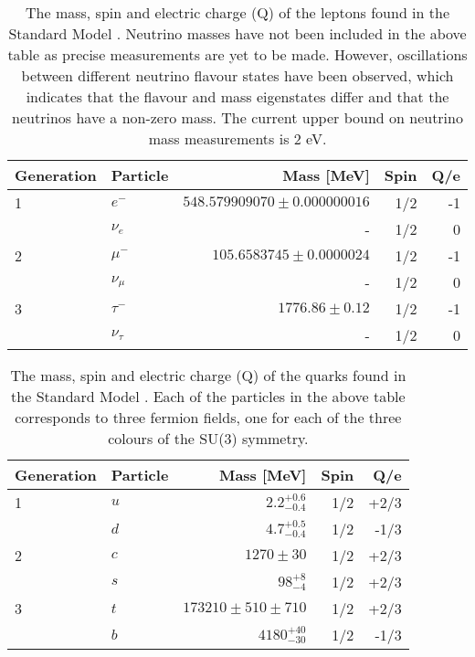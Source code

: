 \begin{table}[h!]
\centering
\begin{tabular}{l l r r r}
\hline
Generation & Particle & Mass [MeV] & Spin & Q/e \\
\hline
1 & $e^{-}$ & $548.579909070\pm0.000000016$ & 1/2 & -1 \\
& $\nu_{e}$ & - & 1/2 & 0 \\
\hline
2 & $\mu^{-}$ & $105.6583745\pm0.0000024$ & 1/2 & -1 \\
& $\nu_{\mu}$ & - & 1/2 & 0 \\
\hline
3 & $\tau^{-}$ & $1776.86\pm0.12$ & 1/2 & -1 \\
& $\nu_{\tau}$ & - & 1/2 & 0 \\
\end{tabular}
\caption[The mass, spin and electric charge (Q) of the leptons found in the Standard Model \cite{Beringer:1900zz}.  Neutrino masses have not been included in the above table as precise measurements are yet to be made.  However, oscillations between different neutrino flavour states have been observed, which indicates that the flavour and mass eigenstates differ and that the neutrinos have a non-zero mass.  The current upper bound on neutrino mass measurements is 2 eV.]{The mass, spin and electric charge (Q) of the leptons found in the Standard Model \cite{Beringer:1900zz}.  Neutrino masses have not been included in the above table as precise measurements are yet to be made.  However, oscillations between different neutrino flavour states have been observed, which indicates that the flavour and mass eigenstates differ and that the neutrinos have a non-zero mass.  The current upper bound on neutrino mass measurements is 2 eV.}
\label{table:smleptons}
\end{table}

\begin{table}[h!]
\centering
\begin{tabular}{l l r r r}
\hline
Generation & Particle & Mass [MeV] & Spin & Q/e \\
\hline
1 & $u$ & $2.2^{+0.6}_{-0.4}$ & 1/2 & +2/3 \\
 & $d$ & $4.7^{+0.5}_{-0.4}$ & 1/2 & -1/3 \\
\hline
2 & $c$ & $1270\pm30$ & 1/2 & +2/3 \\
 & $s$ & $98^{+8}_{-4}$ & 1/2 & +2/3 \\
\hline
3 & $t$ & $173210 \pm 510 \pm 710$ & 1/2 & +2/3 \\
 & $b$ & $4180^{+40}_{-30}$ & 1/2 & -1/3 \\
\end{tabular}
\caption[The mass, spin and electric charge (Q) of the quarks found in the Standard Model \cite{Beringer:1900zz}.  Each of the particles in the above table corresponds to three fermion fields, one for each of the three colours of the SU(3) symmetry.]{The mass, spin and electric charge (Q) of the quarks found in the Standard Model \cite{Beringer:1900zz}.  Each of the particles in the above table corresponds to three fermion fields, one for each of the three colours of the SU(3) symmetry.} 
\label{table:smquarks}
\end{table}

